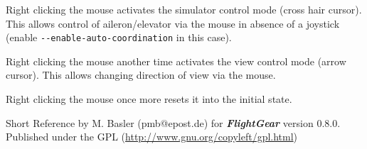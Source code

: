 \documentclass[10pt]{article}
\newcommand{\FlightGear}{{\itshape\bfseries FlightGear}}
\newcommand{\web}[1]{\href{#1}{#1}}
\begin{document}
 \noindent
 Right clicking the mouse activates the simulator control mode (cross hair cursor). This allows
 control of aileron/elevator via the mouse in absence of a joystick
 (enable \texttt{-$ $-enable-auto-coordination} in this case).

 \noindent
 Right clicking the mouse another time activates the view control mode (arrow cursor).
 This allows changing direction of view via the mouse.

 \noindent
 Right clicking the mouse once more resets it into the initial state.
 \medskip

 \noindent
 Short Reference by M. Basler (pmb@epost.de) for \FlightGear{} version 0.8.0.\\
 Published under the GPL (\web{http://www.gnu.org/copyleft/gpl.html})
\end{document}
